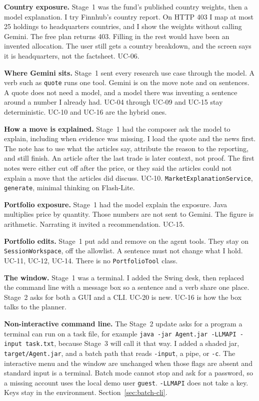 \documentclass[11pt]{article}
\begin{document}
\textbf{Country exposure.}
Stage~1 was the fund's published country weights, then a model explanation.
I try Finnhub's country report. On HTTP 403 I map at most 25 holdings to headquarters countries, and I show the weights without calling Gemini.
The free plan returns 403. Filling in the rest would have been an invented allocation.
The user still gets a country breakdown, and the screen says it is headquarters, not the factsheet. UC-06.

\textbf{Where Gemini sits.}
Stage~1 sent every research use case through the model.
A verb such as \texttt{quote} runs one tool. Gemini is on the move note and on sentences.
A quote does not need a model, and a model there was inventing a sentence around a number I already had.
UC-04 through UC-09 and UC-15 stay deterministic. UC-10 and UC-16 are the hybrid ones.

\textbf{How a move is explained.}
Stage~1 had the composer ask the model to explain, including when evidence was missing.
I load the quote and the news first. The note has to use what the articles say, attribute the reason to the reporting, and still finish. An article after the last trade is later context, not proof.
The first notes were either cut off after the price, or they said the articles could not explain a move that the articles did discuss.
UC-10. \texttt{MarketExplanationService}, \texttt{generate}, minimal thinking on Flash-Lite.

\textbf{Portfolio exposure.}
Stage~1 had the model explain the exposure.
Java multiplies price by quantity. Those numbers are not sent to Gemini.
The figure is arithmetic. Narrating it invited a recommendation.
UC-15.

\textbf{Portfolio edits.}
Stage~1 put add and remove on the agent tools.
They stay on \texttt{SessionWorkspace}, off the allowlist.
A sentence must not change what I hold.
UC-11, UC-12, UC-14. There is no \texttt{PortfolioTool} class.

\textbf{The window.}
Stage~1 was a terminal.
I added the Swing desk, then replaced the command line with a message box so a sentence and a verb share one place.
Stage~2 asks for both a GUI and a CLI.
UC-20 is new. UC-16 is how the box talks to the planner.

\textbf{Non-interactive command line.}
The Stage~2 update asks for a program a terminal can run on a task file, for example \texttt{java -jar Agent.jar -LLMAPI -input task.txt}, because Stage~3 will call it that way.
I added a shaded jar, \texttt{target/Agent.jar}, and a batch path that reads \texttt{-input}, a pipe, or \texttt{-c}.
The interactive menu and the window are unchanged when those flags are absent and standard input is a terminal.
Batch mode cannot stop and ask for a password, so a missing account uses the local demo user \texttt{guest}.
\texttt{-LLMAPI} does not take a key. Keys stay in the environment.
Section~\ref{sec:batch-cli}.
\end{document}
